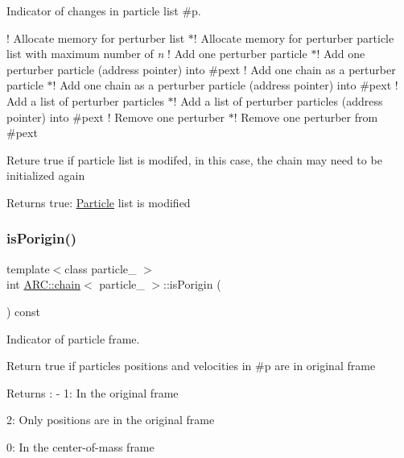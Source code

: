 Indicator of changes in particle list \#p. 

! Allocate memory for perturber list $\ast$! Allocate memory for perturber particle list with maximum number of {\itshape n} ! Add one perturber particle $\ast$! Add one perturber particle (address pointer) into \#pext ! Add one chain as a perturber particle $\ast$! Add one chain as a perturber particle (address pointer) into \#pext ! Add a list of perturber particles $\ast$! Add a list of perturber particles (address pointer) into \#pext ! Remove one perturber $\ast$! Remove one perturber from \#pext

Reture true if particle list is modifed, in this case, the chain may need to be initialized again \begin{DoxyReturn}{Returns}
true\+: \hyperlink{classParticle}{Particle} list is modified 
\end{DoxyReturn}
\hypertarget{classARC_1_1chain_a7ced7404d896ed78a109868a10ee6b56}{}\label{classARC_1_1chain_a7ced7404d896ed78a109868a10ee6b56} 
\subsubsection{\texorpdfstring{is\+Porigin()}{isPorigin()}}
{\footnotesize\ttfamily template$<$class particle\+\_\+ $>$ \\
int \hyperlink{classARC_1_1chain}{A\+R\+C\+::chain}$<$ particle\+\_\+ $>$\+::is\+Porigin (\begin{DoxyParamCaption}{ }\end{DoxyParamCaption}) const\hspace{0.3cm}{\ttfamily [inline]}}



Indicator of particle frame. 

Return true if particles positions and velocities in \#p are in original frame \begin{DoxyReturn}{Returns}
\+: -\/ 1\+: In the original frame
\begin{DoxyItemize}
\item 2\+: Only positions are in the original frame
\item 0\+: In the center-\/of-\/mass frame 
\end{DoxyItemize}
\end{DoxyReturn}
\hypertarget{classARC_1_1chain_a0e375d50ca9a4c01f780dd5698fe6914}{}\label{classARC_1_1chain_a0e375d50ca9a4c01f780dd5698fe6914} 
